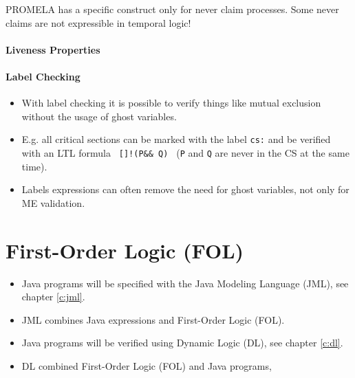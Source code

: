 					PROMELA has a specific construct only for never claim processes. Some never claims are not expressible in temporal logic!

			\subsubsection{Liveness Properties} %

			\subsubsection{Label Checking}
				\begin{itemize}
					\item With label checking it is possible to verify things like mutual exclusion without the usage of ghost variables.
					\item E.g. all critical sections can be marked with the label \texttt{cs:} and be verified with an LTL formula \texttt{ []!(P\@cs \&\& Q\@cs) } (\texttt{P} and \texttt{Q} are never in the CS at the same time).
					\item Labels expressions can often remove the need for ghost variables, not only for ME validation.
				\end{itemize}


\chapter{First-Order Logic (FOL)}
\begin{itemize}
	\item Java programs will be specified with the Java Modeling Language (JML), see chapter \ref{c:jml}.
	\item JML combines Java expressions and First-Order Logic (FOL).
	\item Java programs will be verified using Dynamic Logic (DL), see chapter \ref{c:dl}.
	\item DL combined First-Order Logic (FOL) and Java programs,
\end{itemize}

